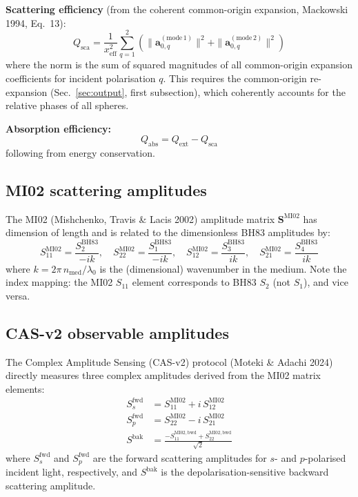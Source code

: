 \documentclass[11pt,a4paper]{article}
\begin{document}
\textbf{Scattering efficiency} (from the coherent common-origin expansion, Mackowski 1994, Eq.~13):
\begin{equation}
  Q_\mathrm{sca} = \frac{1}{x_\mathrm{eff}^2}
  \sum_{q=1}^{2} \left(\|\bm{a}_{0,q}^{(\text{mode}\,1)}\|^2 + \|\bm{a}_{0,q}^{(\text{mode}\,2)}\|^2 \right)
  \label{eq:qsca}
\end{equation}
where the norm is the sum of squared magnitudes of all common-origin expansion coefficients for incident polarisation $q$.
This requires the common-origin re-expansion (Sec.~\ref{sec:output}, first subsection), which coherently accounts for the relative phases of all spheres.

\textbf{Absorption efficiency:}
\begin{equation}
  Q_\mathrm{abs} = Q_\mathrm{ext} - Q_\mathrm{sca}
  \label{eq:qabs}
\end{equation}
following from energy conservation.

\subsection{MI02 scattering amplitudes}

The MI02 (Mishchenko, Travis \& Lacis 2002) amplitude matrix $\mathbf{S}^\mathrm{MI02}$ has dimension of length and is related to the dimensionless BH83 amplitudes by:
\begin{equation}
  S_{11}^\mathrm{MI02} = \frac{S_2^\mathrm{BH83}}{-ik}, \quad
  S_{22}^\mathrm{MI02} = \frac{S_1^\mathrm{BH83}}{-ik}, \quad
  S_{12}^\mathrm{MI02} = \frac{S_3^\mathrm{BH83}}{ik}, \quad
  S_{21}^\mathrm{MI02} = \frac{S_4^\mathrm{BH83}}{ik}
  \label{eq:mi02-conversion}
\end{equation}
where $k = 2\pi\,n_\mathrm{med}/\lambda_0$ is the (dimensional) wavenumber in the medium.
Note the index mapping: the MI02 $S_{11}$ element corresponds to BH83 $S_2$ (not $S_1$), and vice versa.

\subsection{CAS-v2 observable amplitudes}

The Complex Amplitude Sensing (CAS-v2) protocol (Moteki \& Adachi 2024) directly measures three complex amplitudes derived from the MI02 matrix elements:
\begin{align}
  S_s^\mathrm{fwd} &= S_{11}^\mathrm{MI02} + i\,S_{12}^\mathrm{MI02} \label{eq:cas-ss} \\
  S_p^\mathrm{fwd} &= S_{22}^\mathrm{MI02} - i\,S_{21}^\mathrm{MI02} \label{eq:cas-sp} \\
  S^\mathrm{bak}   &= \frac{-S_{11}^\mathrm{MI02,bwd} + S_{22}^\mathrm{MI02,bwd}}{\sqrt{2}} \label{eq:cas-sbak}
\end{align}
where $S_s^\mathrm{fwd}$ and $S_p^\mathrm{fwd}$ are the forward scattering amplitudes for $s$- and $p$-polarised incident light, respectively, and $S^\mathrm{bak}$ is the depolarisation-sensitive backward scattering amplitude.
\end{document}
